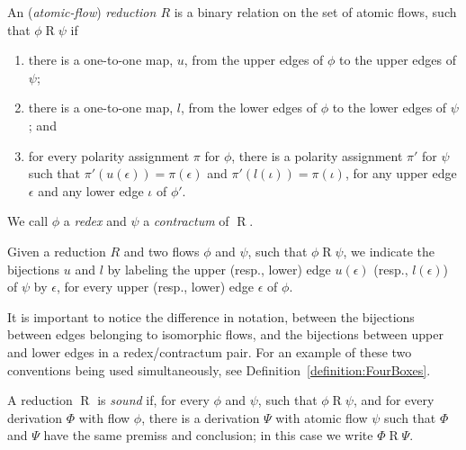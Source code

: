 
\begin{definition}\label{definition:FlowReduction}
An (\emph{atomic-flow}) \emph{reduction $R$} is a binary relation on the set of atomic flows, such that $\phi\mathrel{R}\psi$ if
\begin{enumerate}
\item
there is a one-to-one map, $u$, from the upper edges of $\phi$ to the upper edges of $\psi$;
\item
there is a one-to-one map, $l$, from the lower edges of $\phi$ to the lower edges of $\psi$; and
\item\label{definition:FlowReduction:item:Polarity}
for every polarity assignment $\pi$ for $\phi$, there is a polarity assignment $\pi'$ for $\psi$ such that $\pi'(u(\epsilon))=\pi(\epsilon)$ and $\pi'(l(\iota))=\pi(\iota)$, for any upper edge $\epsilon$ and any lower edge $\iota$ of $\phi'$.
\end{enumerate}
We call $\phi$ a \emph{redex} and $\psi$ a \emph{contractum} of $\mathrel R$.
\end{definition}

\begin{convention}\label{convention:LabelBijectionEdgesReduction}
Given a reduction $R$ and two flows $\phi$ and $\psi$, such that $\phi\mathrel{R}\psi$, we indicate the bijections $u$ and $l$ by labeling the upper (resp., lower) edge $u(\epsilon)$ (resp., $l(\epsilon)$) of $\psi$ by $\epsilon$, for every upper (resp., lower) edge $\epsilon$ of $\phi$.
\end{convention}


It is important to notice the difference in notation, between the bijections between edges belonging to isomorphic flows, and the bijections between upper and lower edges in a redex/contractum pair. For an example of these two conventions being used simultaneously, see Definition~\vref{definition:FourBoxes}.

\begin{definition}\label{definition:SoundRedcution}
A reduction $\mathrel{R}$ is \emph{sound} if, for every $\phi$ and $\psi$, such that $\phi\mathrel{R}\psi$, and for every derivation $\Phi$ with flow $\phi$, there is a derivation $\Psi$ with atomic flow $\psi$ such that $\Phi$ and $\Psi$ have the same premiss and conclusion; in this case we write $\Phi\mathrel{R}\Psi$.
\end{definition}

